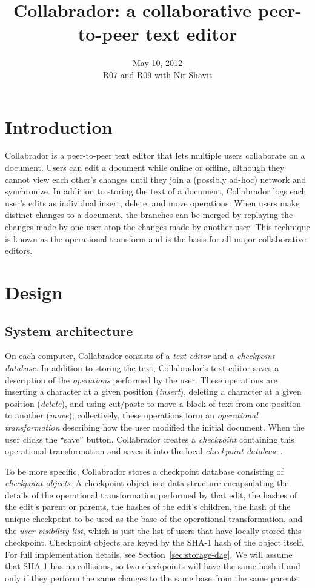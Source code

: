 \documentclass[11pt,titlepage]{article}
\title{Collabrador: a collaborative peer-to-peer text editor}
\author{
  \name{Jacob Hurwitz}{jhurwitz@mit.edu}
  \name{Colleen Josephson}{cjoseph@mit.edu}
  \name{David Lawrence}{dlaw@mit.edu}}
\date{
  May 10, 2012 \\ \small
  R07 and R09 with Nir Shavit}
\begin{document}
\maketitle

\section{Introduction}

Collabrador is a peer-to-peer text editor that lets multiple users
collaborate on a document. Users can edit a document while online or
offline, although they cannot view each other's changes until they
join a (possibly ad-hoc) network and synchronize.  In addition to
storing the text of a document, Collabrador logs each user's edits as
individual insert, delete, and move operations.  When users make
distinct changes to a document, the branches can be merged by
replaying the changes made by one user atop the changes made by
another user.  This technique is known as the operational transform
and is the basis for all major collaborative editors.

\section{Design}

\subsection{System architecture}

On each computer, Collabrador consists of a \emph{text editor} and a
\emph{checkpoint database}. In addition to storing the text,
Collabrador's text editor saves a description of the \emph{operations}
performed by the user. These operations are inserting a character at a
given position (\emph{insert}), deleting a character at a given
position (\emph{delete}), and using cut/paste to move a block of text
from one position to another (\emph{move}); collectively, these
operations form an \emph{operational transformation} describing how
the user modified the initial document. When the user clicks the
``save'' button, Collabrador creates a \emph{checkpoint} containing
this operational transformation and saves it into the local
\emph{checkpoint database} \cite{ot}.

To be more specific, Collabrador stores a checkpoint database
consisting of \emph{checkpoint objects}. A checkpoint object is a data
structure encapsulating the details of the operational transformation
performed by that edit, the hashes of the edit's parent or parents,
the hashes of the edit's children, the hash of the unique checkpoint
to be used as the base of the operational transformation, and the
\emph{user visibility list}, which is just the list of users that have
locally stored this checkpoint. Checkpoint objects are keyed by the
SHA-1 hash of the object itself. For full implementation details, see
Section~\ref{sec:storage-dag}.  We will assume that SHA-1 has no
collisions, so two checkpoints will have the same hash if and only if
they perform the same changes to the same base from the same parents.
\end{document}
